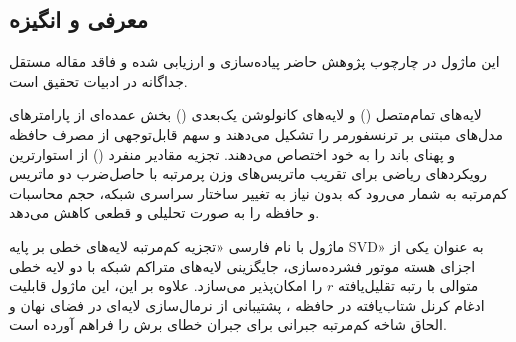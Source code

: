 \subsection{معرفی و انگیزه}
این ماژول در چارچوب پژوهش حاضر پیاده‌سازی و ارزیابی شده و فاقد مقاله مستقل جداگانه در ادبیات تحقیق است.

لایه‌های تمام‌متصل () و لایه‌های کانولوشن یک‌بعدی () بخش عمده‌ای از پارامترهای مدل‌های مبتنی بر ترنسفورمر را تشکیل می‌دهند و سهم قابل‌توجهی از مصرف حافظه و پهنای باند را به خود اختصاص می‌دهند. تجزیه مقادیر منفرد () از استوارترین رویکردهای ریاضی برای تقریب ماتریس‌های وزن پرمرتبه با حاصل‌ضرب دو ماتریس کم‌مرتبه به شمار می‌رود که بدون نیاز به تغییر ساختار سراسری شبکه، حجم محاسبات و حافظه را به صورت تحلیلی و قطعی کاهش می‌دهد.

ماژول  با نام فارسی «تجزیه کم‌مرتبه لایه‌های خطی بر پایه SVD» به عنوان یکی از اجزای هسته موتور فشرده‌سازی، جایگزینی لایه‌های متراکم شبکه با دو لایه خطی متوالی با رتبه تقلیل‌یافته $r$ را امکان‌پذیر می‌سازد. علاوه بر این، این ماژول قابلیت ادغام کرنل شتاب‌یافته  در حافظه ، پشتیبانی از نرمال‌سازی لایه‌ای  در فضای نهان و الحاق شاخه کم‌مرتبه جبرانی  برای جبران خطای برش را فراهم آورده است.
